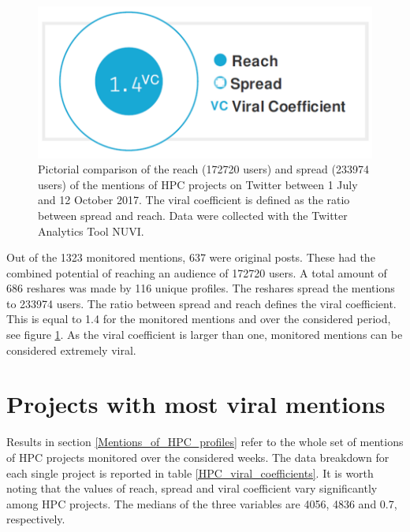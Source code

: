 \begin{figure}[!t] 
 \begin{center}
 \includegraphics[scale=0.3]{Images/HPC_viral_coefficient.png}
 \caption{Pictorial comparison of the reach (172720 users) and spread (233974 users) of the mentions of HPC projects on Twitter between 1 July and 12 October 2017. The viral coefficient is defined as the ratio between spread and reach. Data were collected with the Twitter Analytics Tool NUVI.}
 \label{HPC_viral_coefficient}
 \end{center}
\end{figure}

Out of the 1323 monitored mentions, 637 were original posts. These had the combined potential of reaching an audience of 172720 users. A total amount of 686 reshares was made by 116 unique profiles. The reshares spread the mentions to 233974 users. The ratio between spread and reach defines the viral coefficient. This is equal to 1.4 for the monitored mentions and over the considered period, see figure \ref{HPC_viral_coefficient}. As the viral coefficient is larger than one, monitored mentions can be considered extremely viral. 

\section{Projects with most viral mentions} \label{Projects_with_most_viral_mentions}
Results in section \ref{Mentions_of_HPC_profiles} refer to the whole set of mentions of HPC projects monitored over the considered weeks. The data breakdown for each single project is reported in table \ref{HPC_viral_coefficients}. It is worth noting that the values of reach, spread and viral coefficient vary significantly among HPC projects. The medians of the three variables are 4056, 4836 and 0.7, respectively.     
 
